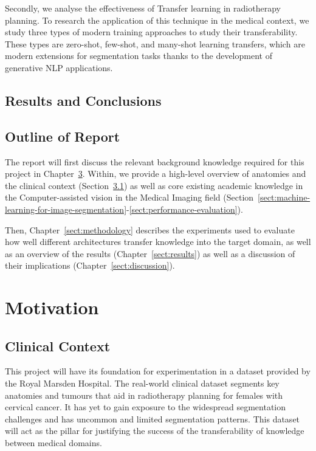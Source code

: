 \documentclass[12pt,twoside]{report}
\begin{document}
Secondly, we analyse the effectiveness of Transfer learning in radiotherapy planning. To research the application of this technique in the medical context, we study three types of modern training approaches to study their transferability. These types are zero-shot, few-shot, and many-shot learning transfers, which are modern extensions for segmentation tasks thanks to the development of generative NLP applications.

\section{Results and Conclusions}

\section{Outline of Report}

The report will first discuss the relevant background knowledge required for this project in Chapter~\ref{sect:motivation}. Within, we provide a high-level overview of anatomies and the clinical context (Section~\ref{sect:clinical-context}) as well as core existing academic knowledge in the Computer-assisted vision in the Medical Imaging field (Section~\ref{sect:machine-learning-for-image-segmentation}-\ref{sect:performance-evaluation}). 

Then, Chapter~\ref{sect:methodology} describes the experiments used to evaluate how well different architectures transfer knowledge into the target domain, as well as an overview of the results (Chapter~\ref{sect:results}) as well as a discussion of their implications (Chapter~\ref{sect:discussion}).

\chapter{Motivation}\label{sect:motivation}

\section{Clinical Context}\label{sect:clinical-context}

This project will have its foundation for experimentation in a dataset provided by the Royal Marsden Hospital. The real-world clinical dataset segments key anatomies and tumours that aid in radiotherapy planning for females with cervical cancer. It has yet to gain exposure to the widespread segmentation challenges and has uncommon and limited segmentation patterns. This dataset will act as the pillar for justifying the success of the transferability of knowledge between medical domains.
\end{document}
